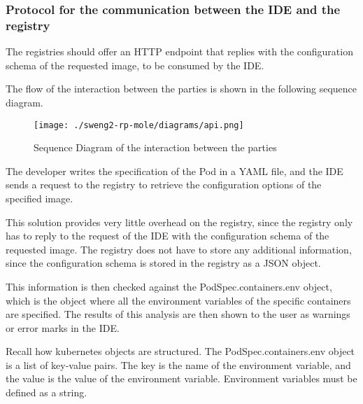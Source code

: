 \documentclass[
  11pt,
]{article}
\begin{document}
\hypertarget{protocol-for-the-communication-between-the-ide-and-the-registry}{%
\subsubsection{Protocol for the communication between the IDE and the
registry}\label{protocol-for-the-communication-between-the-ide-and-the-registry}}

The registries should offer an HTTP endpoint that replies with the
configuration schema of the requested image, to be consumed by the IDE.

The flow of the interaction between the parties is shown in the
following sequence diagram.

\begin{figure}
\centering
\texttt{[image: ./sweng2-rp-mole/diagrams/api.png]}
\caption{Sequence Diagram of the interaction between the parties}
\end{figure}

The developer writes the specification of the Pod in a YAML file, and
the IDE sends a request to the registry to retrieve the configuration
options of the specified image.

This solution provides very little overhead on the registry, since the
registry only has to reply to the request of the IDE with the
configuration schema of the requested image. The registry does not have
to store any additional information, since the configuration schema is
stored in the registry as a JSON object.

This information is then checked against the PodSpec.containers.env
object, which is the object where all the environment variables of the
specific containers are specified. The results of this analysis are then
shown to the user as warnings or error marks in the IDE.

Recall how kubernetes objects are structured. The PodSpec.containers.env
object is a list of key-value pairs. The key is the name of the
environment variable, and the value is the value of the environment
variable. Environment variables must be defined as a string.
\end{document}
